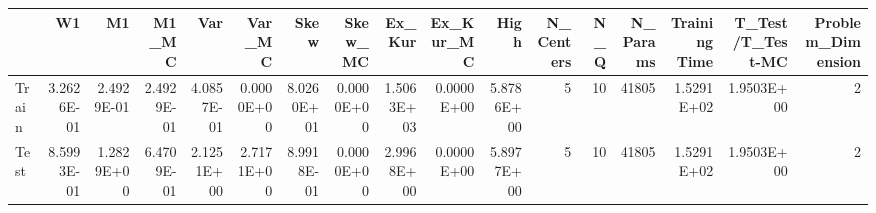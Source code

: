 \begin{tabular}{lrrrrrrrrrrrrrrrr}
\toprule
{} &         W1 &         M1 &      M1\_MC &        Var &     Var\_MC &       Skew &    Skew\_MC &     Ex\_Kur &  Ex\_Kur\_MC &       High &  N\_Centers &  N\_Q &  N\_Params &  Training Time &  T\_Test/T\_Test-MC &  Problem\_Dimension \\
\midrule
Train & 3.2626E-01 & 2.4929E-01 & 2.4929E-01 & 4.0857E-01 & 0.0000E+00 & 8.0260E+01 & 0.0000E+00 & 1.5063E+03 & 0.0000E+00 & 5.8786E+00 &          5 &   10 &     41805 &     1.5291E+02 &        1.9503E+00 &                  2 \\
Test  & 8.5993E-01 & 1.2829E+00 & 6.4709E-01 & 2.1251E+00 & 2.7171E+00 & 8.9918E-01 & 0.0000E+00 & 2.9968E+00 & 0.0000E+00 & 5.8977E+00 &          5 &   10 &     41805 &     1.5291E+02 &        1.9503E+00 &                  2 \\
\bottomrule
\end{tabular}
